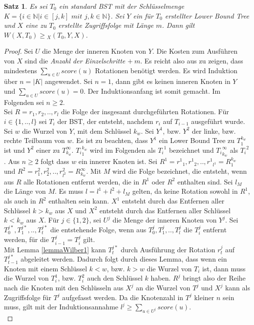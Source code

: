 \documentclass[a4paper,12pt]{article}
\newtheorem{Satz}{Satz}[section]
\begin{document}
\begin{Satz} \label{satzWilber1} Es sei $T_0$ ein standard BST mit der Schlüsselmenge\\ ${K = \{  i \in \mathbb{N} \vert i \in \left[j,k\right] \textit{ mit } j,k \in  \mathbb{N} \}} $. Sei $Y$ ein für $T_0$ erstellter Lower Bound Tree und $X$ eine zu $T_0$ erstellte Zugriffsfolge mit Länge $m$. Dann gilt\\  $W\left(X, T_0\right) \geq {_X(T_0, Y, X)} $.  
\end{Satz}
\begin{proof}
	Sei $U$ die Menge der inneren Knoten von $Y$. Die Kosten zum Ausführen von $X$ sind die \textit{Anzahl der Einzelschritte} $ +~m$. Es reicht also aus zu zeigen, dass mindestens $\sum_{u \in U} {\mathit{score}} \left(u\right)$ Rotationen benötigt werden. Es wird Induktion über  $n = \vert K \vert$ angewendet. Sei $n = 1$, dann gibt es keinen inneren Knoten in $Y$ und $\sum_{u \in U} {\mathit{score}} \left(u\right) = 0$. Der Induktionsanfang ist somit gemacht. Im Folgenden sei $n \geq 2$.\\
	Sei $R = r_1,r_2,..,r_l$ die Folge der insgesamt durchgeführten Rotationen. Für $i \in \{1,..,l\}$ sei $T_i$ der BST, der entsteht, nachdem $r_i$ auf $T_{i-1}$ ausgeführt wurde. Sei $w$ die Wurzel von $Y$, mit dem Schlüssel $k_w$. Sei $Y^1$, bzw. $Y^2$ der linke, bzw. rechte Teilbaum von $w$. Es ist zu beachten, dass $Y^1$ ein Lower Bound Tree zu $T_{1}^{k_w}$ ist und  $Y^2$ einer zu $T^\infty_{k_w}$. ${T_{i}}_1^{k_w}$ wird im Folgenden als ${T_i}^1$ bezeichnet und ${T_{i}}_{k_w}^{\infty}$ als ${T_i}^2$. Aus $n \geq 2$ folgt dass $w$ ein innerer Knoten ist. Sei  $R^1 = {r^1}_1,{r^1}_2,..,{r^1}_{l^1} = R^{k_w}_1$ und $R^2 = r^2_1,r^2_2,..,r^2_{l^2} = R^\infty_{k_w}$. Mit $M$ wird die Folge bezeichnet, die entsteht, wenn aus $R$ alle Rotationen entfernt werden, die in $R^1$ oder $R^2$ enthalten sind. Sei $l_M$ die Länge von $M$. Es muss $l = l^1 + l^2 + l_M$ gelten, da keine Rotation sowohl in $R^1$, als auch in $R^2$ enthalten sein kann. $X^1$ entsteht durch das Entfernen aller Schlüssel $k > k_w$ aus $X$ und  $X^2$ entsteht durch das Entfernen aller Schlüssel $k < k_w$ aus $X$. Für $j \in \{1,2\}$, sei $U^j$ die Menge der inneren Knoten von $Y^j$. Sei $T^{j*}_0,T^{j*}_1,..,T^{j*}_{t}$ die entstehende Folge, wenn aus $T^{j}_0,T^{j}_1,..,T^{j}_{l}$ die $T^j_i$ entfernt werden, für die $T^j_{i-1} = T^j_i$ gilt.\\ Mit Lemma \ref{lemmaWilber1} kann  $T^{j*}_{t}$ durch Ausführung der Rotation $r^j_t$ auf $T^{j*}_{t-1}$ abgeleitet werden. Dadurch folgt durch dieses Lemma, dass wenn ein Knoten mit einem Schlüssel $k < w$, bzw. $k > w$ die Wurzel von $T_i$ ist, dann muss die Wurzel von $T^1_i$, bzw. $T^2_i$ auch den Schlüssel $k$ haben. $R^j$ bringt also der Reihe nach die Knoten mit den Schlüsseln aus $X^j$ an die Wurzel von $T^j$ und  $X^j$ kann als Zugriffsfolge für $T^j$ aufgefasst werden. Da die Knotenzahl in $T^j$ kleiner $n$ sein muss, gilt mit der Induktionsannahme  $l^j \geq \sum_{u \in U^j} {\mathit{score}} (u)$.\\

\end{proof}
\end{document}
